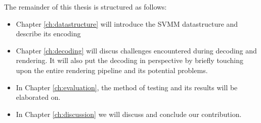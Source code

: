 The remainder of this thesis is structured as follows:
\begin{itemize}
\item Chapter \ref{ch:datastructure} will introduce the SVMM datastructure and describe its encoding
\item Chapter \ref{ch:decoding} will discus challenges encountered during decoding and rendering. It will also put the decoding in perspective by briefly touching upon the entire rendering pipeline and its potential problems.
\item In Chapter \ref{ch:evaluation}, the method of testing and its results will be elaborated on.
\item In Chapter \ref{ch:discussion} we will discuss and conclude our contribution.
\end{itemize}
%